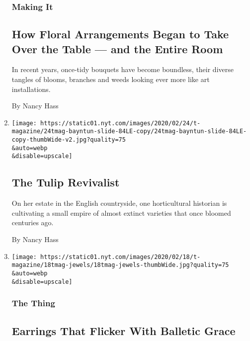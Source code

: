 \begin{enumerate}
  \hypertarget{making-it}{%
  \subsubsection{Making It}\label{making-it}}

  \hypertarget{how-floral-arrangements-began-to-take-over-the-table--and-the-entire-room}{%
  \subsection{How Floral Arrangements Began to Take Over the Table ---
  and the Entire
  Room}\label{how-floral-arrangements-began-to-take-over-the-table--and-the-entire-room}}

  In recent years, once-tidy bouquets have become boundless, their
  diverse tangles of blooms, branches and weeds looking ever more like
  art installations.

  By Nancy Hass
\item
  \href{/2020/02/24/t-magazine/polly-nicholson-bayntun-flowers.html}{}

  \texttt{[image: https://static01.nyt.com/images/2020/02/24/t-magazine/24tmag-bayntun-slide-84LE-copy/24tmag-bayntun-slide-84LE-copy-thumbWide-v2.jpg?quality=75\\\&auto=webp\\\&disable=upscale]}

  \hypertarget{the-tulip-revivalist}{%
  \subsection{The Tulip Revivalist}\label{the-tulip-revivalist}}

  On her estate in the English countryside, one horticultural historian
  is cultivating a small empire of almost extinct varieties that once
  bloomed centuries ago.

  By Nancy Hass
\item
  \href{/2020/02/18/t-magazine/van-cleef-arpels-earrings.html}{}

  \texttt{[image: https://static01.nyt.com/images/2020/02/18/t-magazine/18tmag-jewels/18tmag-jewels-thumbWide.jpg?quality=75\\\&auto=webp\\\&disable=upscale]}

  \hypertarget{the-thing-1}{%
  \subsubsection{The Thing}\label{the-thing-1}}

  \hypertarget{earrings-that-flicker-with-balletic-grace}{%
  \subsection{Earrings That Flicker With Balletic
  Grace}\label{earrings-that-flicker-with-balletic-grace}}


\end{enumerate}
